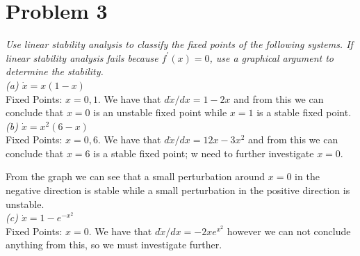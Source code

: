 \documentclass[12pt]{article}
\theoremstyle{remark}
\begin{document}
\section*{Problem 3}

\textit{Use linear stability analysis to classify the fixed points of the following systems. If linear stability analysis fails because $f^\prime(x) = 0$, use a graphical argument to determine the stability.} \\

\textit{(a) $\dot{x} = x(1-x)$} \\

Fixed Points: $x = 0,1$. We have that $d\dot{x}/dx = 1-2x$ and from this we can conclude that $x=0$ is an unstable fixed point while $x=1$ is a stable fixed point. \\

\textit{(b) $\dot{x} = x^2(6-x)$} \\

Fixed Points: $x = 0,6$. We have that $d\dot{x}/dx = 12x - 3x^2$ and from this we can conclude that $x=6$ is a stable fixed point; w need to further investigate $x=0$.

\begin{figure}[H]
	\centering
\end{figure}

From the graph we can see that a small perturbation around $x=0$ in the negative direction is stable while a small perturbation in the positive direction is unstable. \\

\textit{(c) $\dot{x} = 1 - e^{-x^2}$} \\

Fixed Points: $x=0$. We have that $d\dot{x}/dx = -2xe^{x^2}$ however we can not conclude anything from this, so we must investigate further. 

\begin{figure}[H]
	\centering
\end{figure}
\end{document}
